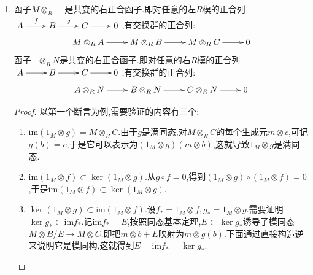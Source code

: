 \begin{enumerate}
\begin{proof}
		设$f'=\mathrm{Hom}(f,1_N)$和$g'=\mathrm{Hom}(g,1_N)$.
		\begin{enumerate}
			\item $\ker g'=\{0\}$.倘若$h:C\to N$满足$g'(h)=h\circ g=0$,按照$g$是满射,就得到$h=0$.
			\item $\mathrm{im}g'\subset\ker f'$.任取模同态$h:C\to N$,那么$f'\circ g'(h)=h\circ g\circ f=0$,于是$f'\circ g'=0$,即$\mathrm{im}g'\subset\ker f'$.
			\item $\ker f'\subset\mathrm{im}g'$.任取$h\in\ker f'$,即$h\circ f=0$.对每个$c\in C$,按照$g$是满射,可取$b\in B$使得$g(b)=c$.现在定义一个映射$k:C\to N$为$k(c)=h(b)$.需要说明这个映射良性,假如还存在$b'\in B$满足$g(b')=c$,那么$b-b'\in\ker g=\mathrm{im}f$,于是存在$a\in A$使得$b-b'=f(a)$,那么$h(b)=h(b')+h(b-b')=h(b')+h\circ f()=h(b')$.再验证$k$是一个模同态,并且满足$g'(k)=k\circ g=h$.这就说明$\ker f'\subset\mathrm{im}g'$.
		\end{enumerate}
	\end{proof}
	\item 函子$M\otimes_R-$是共变的右正合函子.即对任意的左$R$模的正合列$\xymatrix{A\ar[r]^f&B\ar[r]^g&C\ar[r]&0}$,有交换群的正合列:
	$$\xymatrix{M\otimes_RA\ar[r]&M\otimes_RB\ar[r]&M\otimes_RC\ar[r]&0}$$
	函子$-\otimes_RN$是共变的右正合函子.即对任意的右$R$模的正合列$\xymatrix{A\ar[r]&B\ar[r]&C\ar[r]&0}$,有交换群的正合列:
	$$\xymatrix{A\otimes_RN\ar[r]&B\otimes_RN\ar[r]&C\otimes_RN\ar[r]&0}$$
	\begin{proof}
		
		以第一个断言为例,需要验证的内容有三个:
		\begin{enumerate}
			\item $\mathrm{im}(1_M\otimes g)=M\otimes_RC$.由于$g$是满同态,对$M\otimes_RC$的每个生成元$m\otimes c$,可记$g(b)=c$,于是它可以表示为$(1_M\otimes g)(m\otimes b)$,这就导致$1_M\otimes g$是满同态.
			\item $\mathrm{im}(1_M\otimes f)\subset\ker(1_M\otimes g)$.从$g\circ f=0$,得到$(1_M\otimes g)\circ(1_M\otimes f)=0$,于是$\mathrm{im}(1_M\otimes f)\subset\ker(1_M\otimes g)$.
			\item $\ker(1_M\otimes g)\subset\mathrm{im}(1_M\otimes f)$.设$f_*=1_M\otimes f,g_*=1_M\otimes g$.需要证明$\ker g_*\subset\mathrm{im}f_*$.记$\mathrm{im}f_*=E$,按照同态基本定理,$E\subset \ker g_*$诱导了模同态$M\otimes B/E\to M\otimes C$.即把$m\otimes b+E$映射为$m\otimes g(b)$.下面通过直接构造逆来说明它是模同构,这就得到$E=\mathrm{im}f_*=\ker g_*$.
			

\end{enumerate}
\end{proof}
\end{enumerate}
